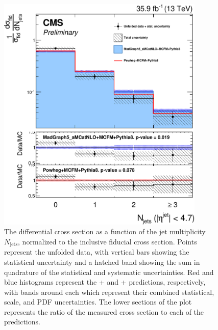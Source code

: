 \begin{figure}[htbp]
  \begin{center}
    \includegraphics[width=0.88\textwidth]{results/unfold_njets.pdf}
    \caption[Normalized differential {\ZZ} cross section as a function of jet multiplicity]{
        The {\ZZ} differential cross section as a function of the jet multiplicity $N_\text{jets}$, normalized to the inclusive fiducial cross section.
        Points represent the unfolded data, with vertical bars showing the statistical uncertainty and a hatched band showing the sum in quadrature of the statistical and systematic uncertainties.
        Red and blue histograms represent the {\POWHEG}+{\MCFM} and {\MGAMC}+{\MCFM} predictions, respectively, with bands around each which represent their combined statistical, scale, and PDF uncertainties.
        The lower sections of the plot represents the ratio of the measured cross section to each of the predictions.
      }\label{fig:unfold_njets}
  \end{center}
\end{figure}

